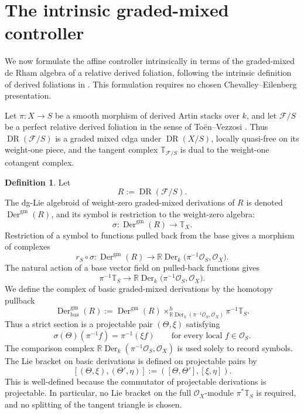 \documentclass[11pt,reqno,a4paper,dvipsnames,x11names]{amsart}
\numberwithin{equation}{section}
\theoremstyle{plain}
\theoremstyle{definition}
\newtheorem{definition}[theorem]{Definition}
\theoremstyle{remark}
\newcommand{\cO}{\mathcal{O}}
\DeclareMathOperator{\Der}{Der}
\DeclareMathOperator{\DR}{DR}
\newcommand{\kk}{k}
\newcommand{\cF}{\mathcal F}
\newcommand{\bbT}{\mathbb T}
\newcommand{\gm}{\mathrm{gm}}
\newcommand{\bas}{\mathrm{bas}}
\newcommand{\from}{\colon}
\begin{document}
\section{The intrinsic graded-mixed controller}\label{sec:intrinsic}

We now formulate the affine controller intrinsically in terms of the graded-mixed de Rham algebra of a relative derived foliation, following the intrinsic definition of derived foliations in \cite[Section~2.1]{TV}. This formulation requires no chosen Chevalley--Eilenberg presentation.

Let \(\pi\from X\to S\) be a smooth morphism of derived Artin stacks over \(\kk\), and let \(\cF/S\) be a perfect relative derived foliation in the sense of To\"en--Vezzosi \cite[Section~2.1]{TV}. Thus \(\DR(\cF/S)\) is a graded mixed cdga under \(\DR(X/S)\), locally quasi-free on its weight-one piece, and the tangent complex \(\bbT_{\cF/S}\) is dual to the weight-one cotangent complex.

\begin{definition}\label{def:basic-gm-der}
Let
\[
 R:=\DR(\cF/S).
\]
The dg-Lie algebroid of weight-zero graded-mixed derivations of \(R\) is denoted
\(\Der^{\gm}(R)\), and its symbol is restriction to the weight-zero algebra:
\[
 \sigma\from\Der^{\gm}(R)\longrightarrow\bbT_X.
\]
Restriction of a symbol to functions pulled back from the base gives a morphism of complexes
\[
 r_S\circ\sigma\from
 \Der^{\gm}(R)
 \longrightarrow
 \mathbb R\Der_{\kk}
 \bigl(\pi^{-1}\cO_S,\cO_X\bigr).
\]
The natural action of a base vector field on pulled-back functions gives
\[
 \pi^{-1}\bbT_S
 \longrightarrow
 \mathbb R\Der_{\kk}
 \bigl(\pi^{-1}\cO_S,\cO_X\bigr).
\]
We define the complex of basic graded-mixed derivations by the homotopy pullback
\[
 \Der^{\gm}_{\bas}(R)
 :=
 \Der^{\gm}(R)
 \times^h_{\mathbb R\Der_{\kk}(\pi^{-1}\cO_S,\cO_X)}
 \pi^{-1}\bbT_S.
\]
Thus a strict section is a projectable pair \((\Theta,\xi)\) satisfying
\[
 \sigma(\Theta)(\pi^{-1}f)=\pi^{-1}(\xi f)
 \qquad
 \text{for every local }f\in\cO_S.
\]
The comparison complex
\(\mathbb R\Der_{\kk}(\pi^{-1}\cO_S,\cO_X)\) is used solely to record symbols. The Lie bracket on basic derivations is defined on projectable pairs by
\[
 [ (\Theta,\xi),(\Theta',\eta) ]
 :=([\Theta,\Theta'],[\xi,\eta]).
\]
This is well-defined because the commutator of projectable derivations is projectable. In particular, no Lie bracket on the full \(\cO_X\)-module \(\pi^*\bbT_S\) is required, and no splitting of the tangent triangle is chosen.
\end{definition}
\end{document}
